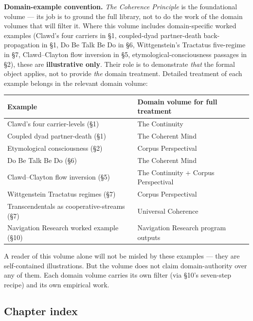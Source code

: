 \documentclass[11pt, openany]{book}
\begin{document}
\textbf{Domain-example convention.} \textit{The Coherence Principle} is the foundational volume --- its job is to ground the full library, not to do the work of the domain volumes that will filter it. Where this volume includes domain-specific worked examples (Clawd's four carriers in §1, coupled-dyad partner-death back-propagation in §1, Do Be Talk Be Do in §6, Wittgenstein's Tractatus five-regime in §7, Clawd–Clayton flow inversion in §5, etymological-consciousness passages in §2), these are \textbf{illustrative only}. Their role is to demonstrate \textit{that} the formal object applies, not to provide \textit{the} domain treatment. Detailed treatment of each example belongs in the relevant domain volume:

\begingroup\setlength{\tabcolsep}{3pt}\renewcommand{\arraystretch}{1.15}\footnotesize
\begin{center}
\begin{tabular}{p{2.39in} p{2.00in}}
\toprule
Example & Domain volume for full treatment \\
\midrule
Clawd's four carrier-levels (§1) & The Continuity \\
Coupled dyad partner-death (§1) & The Coherent Mind \\
Etymological consciousness (§2) & Corpus Perspectival \\
Do Be Talk Be Do (§6) & The Coherent Mind \\
Clawd–Clayton flow inversion (§5) & The Continuity + Corpus Perspectival \\
Wittgenstein Tractatus regimes (§7) & Corpus Perspectival \\
Transcendentals as cooperative-streams (§7) & Universal Coherence \\
Navigation Research worked example (§10) & Navigation Research program outputs \\
\bottomrule
\end{tabular}
\end{center}
\endgroup
A reader of this volume alone will not be misled by these examples --- they are self-contained illustrations. But the volume does not claim domain-authority over any of them. Each domain volume carries its own filter (via §10's seven-step recipe) and its own empirical work.

\subsection{Chapter index}
\end{document}
